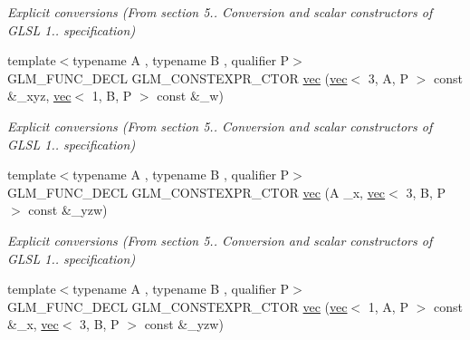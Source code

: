 \begin{DoxyCompactItemize}
\begin{DoxyCompactList}\small\item\em Explicit conversions (From section 5.. Conversion and scalar constructors of G\+L\+SL 1.. specification) \end{DoxyCompactList}\item 
\mbox{\label{structglm_1_1vec_3_014_00_01T_00_01Q_01_4_a978b89aabfd77a4d64bbd7d347e98ffe}} 
{\footnotesize template$<$typename A , typename B , qualifier P$>$ }\\G\+L\+M\+\_\+\+F\+U\+N\+C\+\_\+\+D\+E\+CL G\+L\+M\+\_\+\+C\+O\+N\+S\+T\+E\+X\+P\+R\+\_\+\+C\+T\+OR \hyperlink{structglm_1_1vec_3_014_00_01T_00_01Q_01_4_a978b89aabfd77a4d64bbd7d347e98ffe}{vec} (\hyperlink{structglm_1_1vec}{vec}$<$ 3, A, P $>$ const \&\+\_\+xyz, \hyperlink{structglm_1_1vec}{vec}$<$ 1, B, P $>$ const \&\+\_\+w)
\begin{DoxyCompactList}\small\item\em Explicit conversions (From section 5.. Conversion and scalar constructors of G\+L\+SL 1.. specification) \end{DoxyCompactList}\item 
\mbox{\label{structglm_1_1vec_3_014_00_01T_00_01Q_01_4_a91225fa0646f68aae775792183d3e0df}} 
{\footnotesize template$<$typename A , typename B , qualifier P$>$ }\\G\+L\+M\+\_\+\+F\+U\+N\+C\+\_\+\+D\+E\+CL G\+L\+M\+\_\+\+C\+O\+N\+S\+T\+E\+X\+P\+R\+\_\+\+C\+T\+OR \hyperlink{structglm_1_1vec_3_014_00_01T_00_01Q_01_4_a91225fa0646f68aae775792183d3e0df}{vec} (A \+\_\+x, \hyperlink{structglm_1_1vec}{vec}$<$ 3, B, P $>$ const \&\+\_\+yzw)
\begin{DoxyCompactList}\small\item\em Explicit conversions (From section 5.. Conversion and scalar constructors of G\+L\+SL 1.. specification) \end{DoxyCompactList}\item 
\mbox{\label{structglm_1_1vec_3_014_00_01T_00_01Q_01_4_a307578dc6d0a7ff71643918d29ddcaa8}} 
{\footnotesize template$<$typename A , typename B , qualifier P$>$ }\\G\+L\+M\+\_\+\+F\+U\+N\+C\+\_\+\+D\+E\+CL G\+L\+M\+\_\+\+C\+O\+N\+S\+T\+E\+X\+P\+R\+\_\+\+C\+T\+OR \hyperlink{structglm_1_1vec_3_014_00_01T_00_01Q_01_4_a307578dc6d0a7ff71643918d29ddcaa8}{vec} (\hyperlink{structglm_1_1vec}{vec}$<$ 1, A, P $>$ const \&\+\_\+x, \hyperlink{structglm_1_1vec}{vec}$<$ 3, B, P $>$ const \&\+\_\+yzw)

\end{DoxyCompactItemize}
